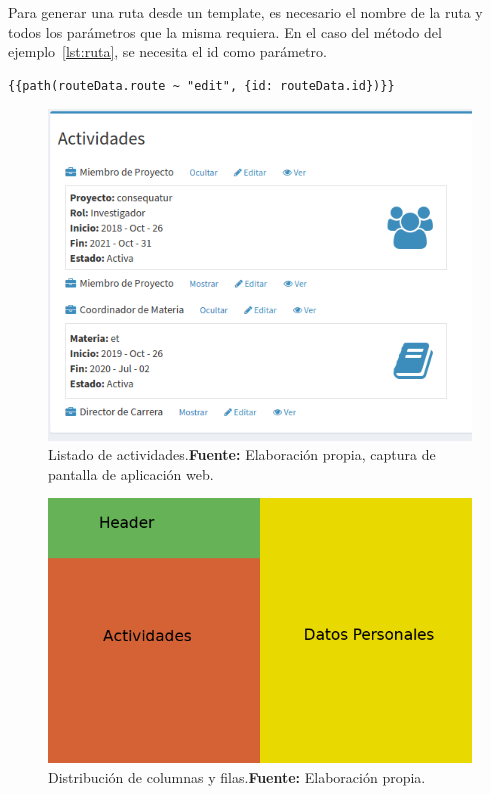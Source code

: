 Para generar una ruta desde un template, es necesario el nombre de la ruta y todos los parámetros que la misma requiera. En el caso del método del ejemplo~\ref{lst:ruta}, se necesita el id como parámetro.


\begin{lstlisting}[caption={Generación de una ruta desde un template.\\Fuente: Elaboración propia.}, label={lst:path}]
{{path(routeData.route ~ "edit", {id: routeData.id})}}
\end{lstlisting}


\begin{figure}[h]
    \includegraphics[width=1\linewidth]{image/vista_persona.png}
    \caption{Listado de actividades.\newline \textbf{Fuente:} Elaboración propia, captura de pantalla de aplicación web.}
    \label{fig:image/vista_persona}
\end{figure}


\begin{figure}[h]
    \includegraphics[width=1\linewidth]{image/grid.png}
    \caption{Distribución de columnas y filas.\newline \textbf{Fuente:} Elaboración propia.}
    \label{fig:image/grid}
\end{figure}

